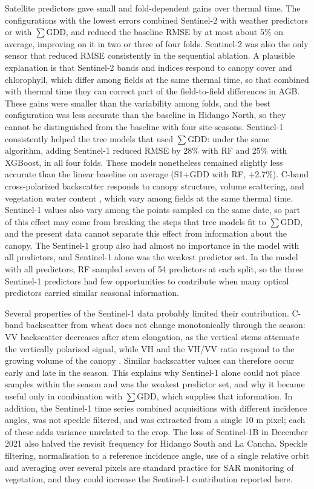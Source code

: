\documentclass[
  british,
]{interact}
\begin{document}
Satellite predictors gave small and fold-dependent gains over thermal
time. The configurations with the lowest errors combined Sentinel-2 with
weather predictors or with \(\sum\)GDD, and reduced the baseline RMSE by
at most about 5\% on average, improving on it in two or three of four
folds. Sentinel-2 was also the only sensor that reduced RMSE
consistently in the sequential ablation. A plausible explanation is that
Sentinel-2 bands and indices respond to canopy cover and chlorophyll,
which differ among fields at the same thermal time, so that combined
with thermal time they can correct part of the field-to-field
differences in AGB. These gains were smaller than the variability among
folds, and the best configuration was less accurate than the baseline in
Hidango North, so they cannot be distinguished from the baseline with
four site-seasons. Sentinel-1 consistently helped the tree models that
used \(\sum\)GDD: under the same algorithm, adding Sentinel-1 reduced
RMSE by 28\% with RF and 25\% with XGBoost, in all four folds. These
models nonetheless remained slightly less accurate than the linear
baseline on average (S1+GDD with RF, +2.7\%). C-band cross-polarized
backscatter responds to canopy structure, volume scattering, and
vegetation water content \citep{Veloso2017}, which vary among fields at
the same thermal time. Sentinel-1 values also vary among the points
sampled on the same date, so part of this effect may come from breaking
the steps that tree models fit to \(\sum\)GDD, and the present data
cannot separate this effect from information about the canopy. The
Sentinel-1 group also had almost no importance in the model with all
predictors, and Sentinel-1 alone was the weakest predictor set. In the
model with all predictors, RF sampled seven of 54 predictors at each
split, so the three Sentinel-1 predictors had few opportunities to
contribute when many optical predictors carried similar seasonal
information.

Several properties of the Sentinel-1 data probably limited their
contribution. C-band backscatter from wheat does not change
monotonically through the season: VV backscatter decreases after stem
elongation, as the vertical stems attenuate the vertically polarised
signal, while VH and the VH/VV ratio respond to the growing volume of
the canopy \citep{Veloso2017}. Similar backscatter values can therefore
occur early and late in the season. This explains why Sentinel-1 alone
could not place samples within the season and was the weakest predictor
set, and why it became useful only in combination with \(\sum\)GDD,
which supplies that information. In addition, the Sentinel-1 time series
combined acquisitions with different incidence angles, was not speckle
filtered, and was extracted from a single 10 m pixel; each of these adds
variance unrelated to the crop. The loss of Sentinel-1B in December 2021
also halved the revisit frequency for Hidango South and La Cancha.
Speckle filtering, normalisation to a reference incidence angle, use of
a single relative orbit and averaging over several pixels are standard
practice for SAR monitoring of vegetation, and they could increase the
Sentinel-1 contribution reported here.
\end{document}
